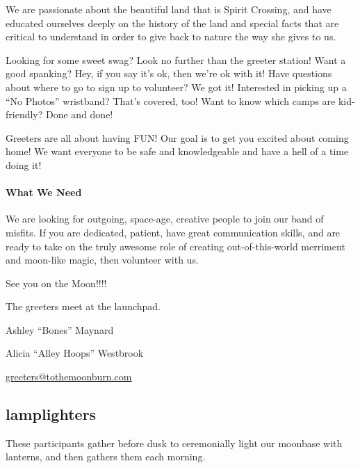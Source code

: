 \begin{multicols}{2}
We are passionate about the beautiful land that is Spirit Crossing, and have educated ourselves deeply on the history of the land and special facts that are critical to understand in order to give back to nature the way she gives to us. 

Looking for some sweet \gls{swag}? Look no further than the \gls{greeter} station!  Want a good spanking?  Hey, if you say it's ok, then we're ok with it!  Have questions about where to go to sign up to volunteer? We got it!  Interested in picking up a ``No Photos'' wristband? That's covered, too!  Want to know which camps are kid-friendly?  Done and done!

Greeters are all about having FUN!  Our goal is to get you excited about coming home!  We want everyone to be safe and knowledgeable and have a hell of a time doing it!   

\paragraph{What We Need}

We are looking for outgoing, space-age, creative people to join our band of misfits.  If you are dedicated, patient, have great communication skills, and are ready to take on the truly awesome role of creating out-of-this-world merriment and moon-like magic, then volunteer with us. 

See you on the Moon!!!!

The \glspl{greeter} meet at the \gls{launchpad}.

\begin{description}[leftmargin=6em,noitemsep,style=nextline]
   \item[Lead:] Ashley ``Bones'' Maynard
   \item[Co-leads:] Alicia ``Alley Hoops'' Westbrook
   \item[Contact:] \url{greeters@tothemoonburn.com}
\end{description}


\subsection*{\Gls{lamplighters}}
These participants gather before dusk to ceremonially light our moonbase with lanterns, and then gathers them each morning.   


\end{multicols}
